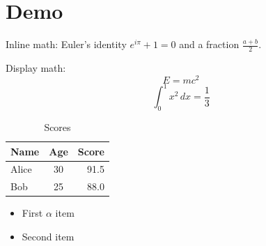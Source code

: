 \documentclass{article}
\begin{document}
\section{Demo}

Inline math: Euler's identity $e^{i\pi} + 1 = 0$ and a fraction $\frac{a+b}{2}$.

Display math:
$$E = mc^2$$
\begin{equation}
\int_0^1 x^2\,dx = \frac{1}{3}
\end{equation}

\begin{table}[h]
\centering
\begin{tabular}{lcr}
\toprule
Name & Age & Score \\
\midrule
Alice & 30 & 91.5 \\
Bob & 25 & 88.0 \\
\bottomrule
\end{tabular}
\caption{Scores}
\end{table}

\begin{itemize}
\item First $\alpha$ item
\item Second item
\end{itemize}
\end{document}
